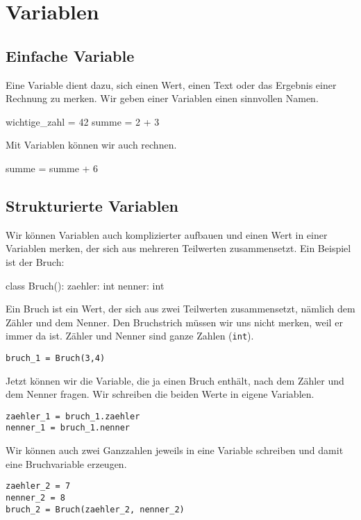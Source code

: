 \section{Variablen}

\subsection*{Einfache Variable}

Eine Variable dient dazu, sich einen Wert, einen Text oder das Ergebnis einer Rechnung zu merken. Wir geben einer Variablen einen sinnvollen Namen.

\begin{codePython}
wichtige_zahl = 42
summe = 2 + 3
\end{codePython}

Mit Variablen können wir auch rechnen.

\begin{codePython}
summe = summe + 6
\end{codePython}

\subsection*{Strukturierte Variablen}

Wir können Variablen auch komplizierter aufbauen und einen Wert in einer Variablen merken, der sich aus mehreren Teilwerten zusammensetzt. Ein Beispiel ist der Bruch:

\begin{codePython}
class Bruch():
	zaehler: int
	nenner: int
\end{codePython}

Ein Bruch ist ein Wert, der sich aus zwei Teilwerten zusammensetzt, nämlich dem Zähler und dem Nenner. Den Bruchstrich müssen wir uns nicht merken, weil er immer da ist. Zähler und Nenner sind ganze Zahlen (\texttt{int}).

\lstset{style=syntaxPython}
\begin{lstlisting}
bruch_1 = Bruch(3,4)
\end{lstlisting}

Jetzt können wir die Variable, die ja einen Bruch enthält, nach dem Zähler und dem Nenner fragen. Wir schreiben die beiden Werte in eigene Variablen.

\begin{lstlisting}
zaehler_1 = bruch_1.zaehler
nenner_1 = bruch_1.nenner
\end{lstlisting}

Wir können auch zwei Ganzzahlen jeweils in eine Variable schreiben und damit eine Bruchvariable erzeugen.

\begin{lstlisting}
zaehler_2 = 7
nenner_2 = 8
bruch_2 = Bruch(zaehler_2, nenner_2)
\end{lstlisting}